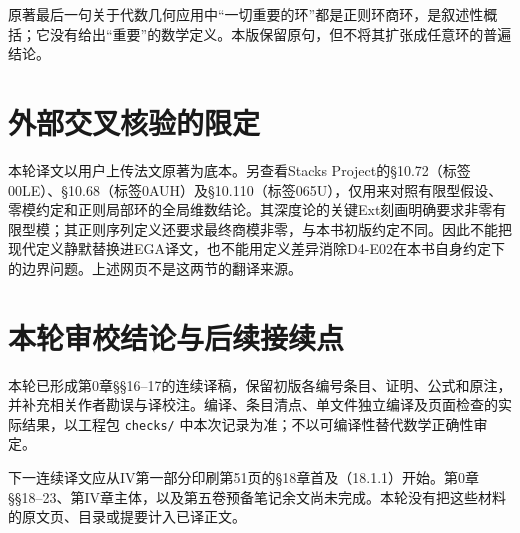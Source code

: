 原著最后一句关于代数几何应用中“一切重要的环”都是正则环商环，是叙述性概括；它没有给出“重要”的数学定义。本版保留原句，但不将其扩张成任意环的普遍结论。

\section{外部交叉核验的限定}
本轮译文以用户上传法文原著为底本。另查看Stacks Project的§10.72（标签00LE）、§10.68（标签0AUH）及§10.110（标签065U），仅用来对照有限型假设、零模约定和正则局部环的全局维数结论。其深度论的关键Ext刻画明确要求非零有限型模；其正则序列定义还要求最终商模非零，与本书初版约定不同。因此不能把现代定义静默替换进EGA译文，也不能用定义差异消除D4-E02在本书自身约定下的边界问题。上述网页不是这两节的翻译来源。

\section{本轮审校结论与后续接续点}
本轮已形成第0章§§16--17的连续译稿，保留初版各编号条目、证明、公式和原注，并补充相关作者勘误与译校注。编译、条目清点、单文件独立编译及页面检查的实际结果，以工程包 \texttt{checks/} 中本次记录为准；不以可编译性替代数学正确性审定。

下一连续译文应从IV第一部分印刷第51页的§18章首及（18.1.1）开始。第0章§§18--23、第IV章主体，以及第五卷预备笔记余文尚未完成。本轮没有把这些材料的原文页、目录或提要计入已译正文。
